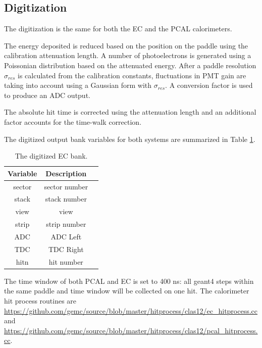 \subsection{Digitization}
The digitization is the same for both the EC and the PCAL calorimeters.


The energy deposited is reduced based on the position on the paddle using the calibration attenuation length.
A number of photoelectrons is generated using a Poissonian distribution based on the attenuated energy.
After a paddle resolution $\sigma_{res}$ is calculated from the calibration constants, fluctuations in PMT gain
are taking into account using a Gaussian form with $\sigma_{res}$. A conversion factor is used to produce an ADC output.

The absolute hit time is corrected using the attenuation length and an additional factor accounts for the time-walk correction.


The digitized output bank variables for both systems are summarized in Table \ref{tab:ecBank}.

\begin{table}[h]
	\begin{center}
		\begin{tabular}{| c | c | c |}
			\hline \hline
			Variable & Description                                         \\
			\hline
             sector  &                                     sector number   \\
              stack  &                                      stack number   \\
               view  &                                              view   \\
              strip  &                                      strip number   \\
                ADC  &                                          ADC Left   \\
                TDC  &                                         TDC Right   \\
               hitn  &                                        hit number   \\
			\hline \hline
		\end{tabular}
	\end{center}
	\caption{The digitized EC bank.}\label{tab:ecBank}
\end{table}


The time window of both PCAL and EC is set to 400 ns: all geant4 steps within the same paddle and time window will be collected on one hit.
The calorimeter hit process routines are \url{https://github.com/gemc/source/blob/master/hitprocess/clas12/ec_hitprocess.cc} and
\url{https://github.com/gemc/source/blob/master/hitprocess/clas12/pcal_hitprocess.cc}.

